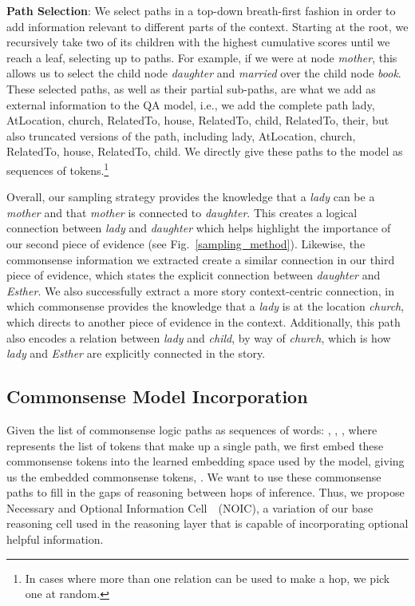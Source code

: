\documentclass[11pt,a4paper]{article}
\def\figref#1{Fig.~\ref{#1}}
\newcommand{\fullModel}{NOIC}
\newcommand{\fullModelFullName}{Necessary and Optional Information Cell~}
\begin{document}
\noindent\textbf{Path Selection}:
We select paths in a top-down breath-first fashion in order to add information relevant to different parts of the context.
Starting at the root, we recursively take two of its children with the highest cumulative scores until we reach a leaf, selecting up to  paths. For example, if we were at node {\it mother}, this allows us to select the child node {\it daughter} and {\it married} over the child node {\it book}.
These selected paths, as well as their partial sub-paths, are what we add as external information to the QA model, i.e., we add the complete path lady, AtLocation, church, RelatedTo, house, RelatedTo, child, RelatedTo, their, but also truncated versions of the path, including lady, AtLocation, church, RelatedTo, house, RelatedTo, child.
We directly give these paths to the model as sequences of tokens.\footnote{In cases where more than one relation can be used to make a hop, we pick one at random.}

Overall, our sampling strategy provides the knowledge that a {\it lady} can be a  {\it mother} and that {\it mother} is connected to {\it daughter}. This creates a logical connection between {\it lady} and {\it daughter} which helps highlight the importance of our second piece of evidence (see \figref{sampling_method}). Likewise, the commonsense information we extracted create a similar connection in our third piece of evidence, which states the explicit connection between {\it daughter} and {\it Esther}.
We also successfully extract a more story context-centric connection, in which commonsense provides the knowledge that a {\it lady} is at the location {\it church}, which directs to another piece of evidence in the context. Additionally, this path also encodes a relation between  {\it lady} and {\it child}, by way of {\it church}, which is how {\it lady} and {\it Esther} are explicitly connected in the story.


\subsection{Commonsense Model Incorporation}
\label{sec:commonsense_model_inc}

Given the list of commonsense logic paths as sequences of words:   , , ,  where  represents the list of tokens that make up a single path, we first embed these commonsense tokens into the learned embedding space used by the model, giving us the embedded commonsense tokens, .
We want to use these commonsense paths to fill in the gaps of reasoning between hops of inference.
Thus, we propose \fullModelFullName\ (\fullModel), a variation of our base reasoning cell used in the reasoning layer that is capable of incorporating optional helpful information.
 
\end{document}
